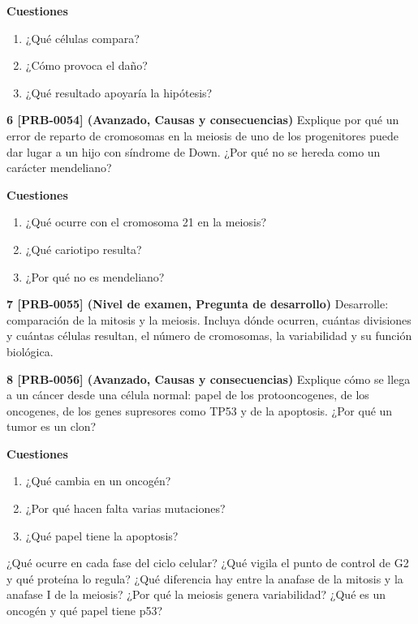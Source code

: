 \documentclass{book}
\begin{document}
\begin{tcolorbox}[title={Ejercicios}, studiumworked, breakable]
\noindent\textbf{Cuestiones}
\begin{enumerate}
\item ¿Qué células compara?
\item ¿Cómo provoca el daño?
\item ¿Qué resultado apoyaría la hipótesis?
\end{enumerate}

\noindent\textbf{6 [PRB-0054] (Avanzado, Causas y consecuencias)}
Explique por qué un error de reparto de cromosomas en la meiosis de uno de los progenitores puede dar lugar a un hijo con síndrome de Down. ¿Por qué no se hereda como un carácter mendeliano?


\noindent\textbf{Cuestiones}
\begin{enumerate}
\item ¿Qué ocurre con el cromosoma 21 en la meiosis?
\item ¿Qué cariotipo resulta?
\item ¿Por qué no es mendeliano?
\end{enumerate}

\noindent\textbf{7 [PRB-0055] (Nivel de examen, Pregunta de desarrollo)}
Desarrolle: comparación de la mitosis y la meiosis. Incluya dónde ocurren, cuántas divisiones y cuántas células resultan, el número de cromosomas, la variabilidad y su función biológica.


\noindent\textbf{8 [PRB-0056] (Avanzado, Causas y consecuencias)}
Explique cómo se llega a un cáncer desde una célula normal: papel de los protooncogenes, de los oncogenes, de los genes supresores como TP53 y de la apoptosis. ¿Por qué un tumor es un clon?


\noindent\textbf{Cuestiones}
\begin{enumerate}
\item ¿Qué cambia en un oncogén?
\item ¿Por qué hacen falta varias mutaciones?
\item ¿Qué papel tiene la apoptosis?
\end{enumerate}
\end{tcolorbox}

\begin{tcolorbox}[title={Autoficha}, studiumcheck, breakable]

¿Qué ocurre en cada fase del ciclo celular? ¿Qué vigila el punto de control de G2 y qué proteína lo regula? ¿Qué diferencia hay entre la anafase de la mitosis y la anafase I de la meiosis? ¿Por qué la meiosis genera variabilidad? ¿Qué es un oncogén y qué papel tiene p53?

\end{tcolorbox}
\end{document}
